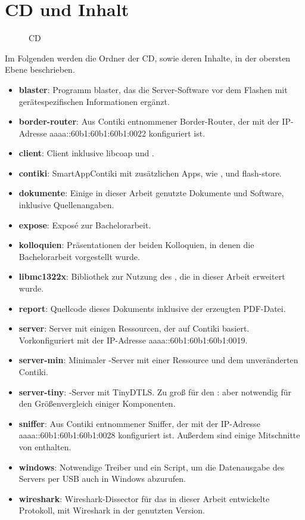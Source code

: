 \chapter{CD und Inhalt}

\begin{figure}[!ht]
\centering
{}
\caption{CD}
\label{tbl:a-cd}
\end{figure}

\clearpage

Im Folgenden werden die Ordner der CD, sowie deren Inhalte, in der obersten Ebene beschrieben.

\begin{itemize}
  \item \textbf{blaster}: Programm blaster, das die Server-Software vor dem Flashen mit gerätespezifischen Informationen ergänzt.
  \item \textbf{border-router}: Aus Contiki entnommener Border-Router, der mit der IP-Adresse aaaa::60b1:60b1:60b1:0022 konfiguriert ist.
  \item \textbf{client}: Client inklusive libcoap und .
  \item \textbf{contiki}: SmartAppContiki mit zusätzlichen Apps, wie ,  und flash-store.
  \item \textbf{dokumente}: Einige in dieser Arbeit genutzte Dokumente und Software, inklusive Quellenangaben.
  \item \textbf{expose}: Exposé zur Bachelorarbeit.
  \item \textbf{kolloquien}: Präsentationen der beiden Kolloquien, in denen die Bachelorarbeit vorgestellt wurde.
  \item \textbf{libmc1322x}: Bibliothek zur Nutzung des , die in dieser Arbeit erweitert wurde.
  \item \textbf{report}: Quellcode dieses Dokuments inklusive der erzeugten PDF-Datei.
  \item \textbf{server}: Server mit einigen Ressourcen, der auf Contiki basiert. Vorkonfiguriert mit der IP-Adresse aaaa::60b1:60b1:60b1:0019.
  \item \textbf{server-min}: Minimaler -Server mit einer Ressource und dem unveränderten Contiki.
  \item \textbf{server-tiny}: -Server mit TinyDTLS. Zu groß für den : aber notwendig für den Größenvergleich einiger Komponenten.
  \item \textbf{sniffer}: Aus Contiki entnommener Sniffer, der mit der IP-Adresse aaaa::60b1:60b1:60b1:0028 konfiguriert ist. Außerdem sind einige Mitschnitte von  enthalten.
  \item \textbf{windows}: Notwendige Treiber und ein Script, um die Datenausgabe des Servers per USB auch in Windows abzurufen.
  \item \textbf{wireshark}: Wireshark-Dissector für das in dieser Arbeit entwickelte Protokoll, mit Wireshark in der genutzten Version.
\end{itemize}
